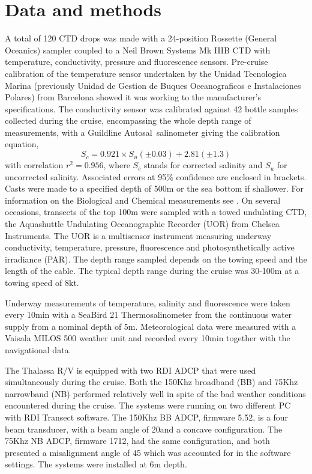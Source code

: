 \section{Data and methods}
A total of 120 CTD drops was made with a 24-position Rossette
(General Oceanics) sampler coupled to a Neil Brown Systems Mk IIIB
CTD with temperature, conductivity, pressure and fluorescence
sensors. Pre-cruise calibration of the temperature sensor
undertaken by the Unidad Tecnologica Marina (previously Unidad de
Gestion de Buques Oceanograficos e Instalaciones Polares) from
Barcelona showed it was working to the manufacturer's
specifications. The conductivity sensor was calibrated against 42
bottle samples collected during the cruise, encompassing the whole
depth range of measurements, with a Guildline Autosal\circledR \,
salinometer giving the calibration equation,
\begin{equation}
S_c=0.921\times S_u (\pm 0.03) + 2.81 (\pm 1.3)
\end{equation}
with correlation $r^2=0.956$, where $S_c$ stands for corrected
salinity and $S_u$ for uncorrected salinity. Associated errors at
95\% confidence are enclosed in brackets. Casts were made to a
specified depth of 500m or the sea bottom if shallower. For
information on the Biological and Chemical measurements see
\citet{Varelaomex00,Varela00}. On several occasions, transects of
the top 100m were sampled with a towed undulating CTD, the
Aquashuttle Undulating Oceanographic Recorder (UOR) from Chelsea
Instruments. The UOR is a multisensor instrument measuring
underway conductivity, temperature, pressure, fluorescence and
photosynthetically active irradiance (PAR). The depth range
sampled depends on the towing speed and the length of the cable.
The typical depth range during the cruise was 30-100m at a towing
speed of 8kt.

Underway measurements of temperature, salinity and fluorescence
were taken every 10min with a SeaBird 21 Thermosalinometer from
the continuous water supply from a nominal depth of 5m.
Meteorological data were measured with a Vaisala MILOS 500 weather
unit and recorded every 10min together with the navigational data.

The Thalassa R/V is equipped with two RDI ADCP that were used
simultaneously during the cruise. Both the 150Khz broadband (BB)
and 75Khz narrowband (NB) performed relatively well in spite of
the bad weather conditions encountered during the cruise. The
systems were running on two different PC with RDI Transect
software. The 150Khz BB ADCP, firmware 5.52, is a four beam
transducer, with a beam angle of 20\deg and a concave
configuration. The 75Khz NB ADCP, firmware 1712, had the same
configuration, and both presented a misalignment angle of 45\deg
which was accounted for in the software settings. The systems were
installed at 6m depth.

